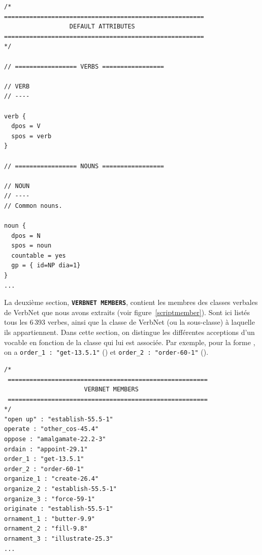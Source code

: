 \begin{lstlisting}[language=mate, caption = Extrait du \emph{lexicon}: attributs par défaut des classes génériques, label=classedef]
/*
=======================================================
                  DEFAULT ATTRIBUTES
=======================================================
*/

// ================= VERBS =================

// VERB
// ----

verb {
  dpos = V
  spos = verb
}

// ================= NOUNS =================

// NOUN
// ----
// Common nouns.

noun {
  dpos = N
  spos = noun
  countable = yes
  gp = { id=NP dia=1}
}
...
\end{lstlisting}

La deuxième section, \textbf{\texttt{VERBNET MEMBERS}}, contient les membres des classes verbales de VerbNet que nous avons extraits (voir figure~\ref{scriptmember}). Sont ici listés tous les 6\,393 verbes, ainsi que la classe de VerbNet (ou la sous-classe) à laquelle ils appartiennent. Dans cette section, on distingue les différentes acceptions d'un vocable en fonction de la classe qui lui est associée. Par exemple, pour la forme , on a \texttt{order\_1 : "get-13.5.1"} () et \texttt{order\_2 : "order-60-1"} ().

\begin{lstlisting}[language=mate, caption = Extrait du \emph{lexicon}: unités lexicales verbales]
/*
 =======================================================
                      VERBNET MEMBERS
 =======================================================
*/
"open up" : "establish-55.5-1"
operate : "other_cos-45.4"
oppose : "amalgamate-22.2-3"
ordain : "appoint-29.1"
order_1 : "get-13.5.1"
order_2 : "order-60-1"
organize_1 : "create-26.4"
organize_2 : "establish-55.5-1"
organize_3 : "force-59-1"
originate : "establish-55.5-1"
ornament_1 : "butter-9.9"
ornament_2 : "fill-9.8"
ornament_3 : "illustrate-25.3"
...
\end{lstlisting}

